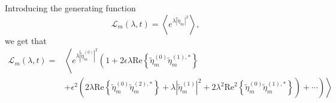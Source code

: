 \documentclass[a4paper,11pt]{article}
\begin{document}
Introducing the generating function
\[
\mathcal{L}_{m}(\lambda,t) = \left< e^{\lambda\left|\tilde{\eta}_{m}\right|^{2}} \right>,
\]
we get that 
\begin{align*}
\mathcal{L}_{m}(\lambda,t) = & \left<e^{\lambda\left|\tilde{\eta}_{m}^{(0)}\right|^{2}}\left(1 + 2\epsilon\lambda \mbox{Re}\left\{\tilde{\eta}^{(0)}_{m}\tilde{\eta}^{(1),\ast}_{m} \right\}\right.\right.\\
& \left.\left. +\epsilon^{2}\left(2\lambda\mbox{Re}\left\{ \tilde{\eta}^{(0)}_{m}\tilde{\eta}^{(2),\ast}_{m} \right\} + \lambda \left|\tilde{\eta}^{(1)}_{m} \right|^{2} +2\lambda^{2} \mbox{Re}^{2}\left\{\tilde{\eta}^{(0)}_{m}\tilde{\eta}^{(1),\ast}_{m}\right\} \right)+\cdots\right)\right>
\end{align*}
\end{document}

